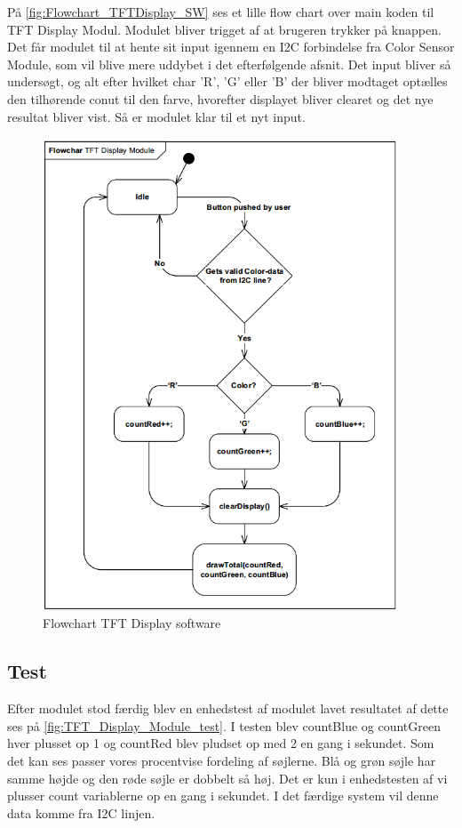 På \autoref{fig:Flowchart_TFTDisplay_SW} ses et lille flow chart over main koden til TFT Display Modul. Modulet bliver trigget af at brugeren trykker på knappen. Det får modulet til at hente sit input igennem en I2C forbindelse fra Color Sensor Module, som vil blive mere uddybet i det efterfølgende afsnit. Det input bliver så undersøgt, og alt efter hvilket char 'R', 'G' eller 'B' der bliver modtaget optælles den tilhørende conut til den farve, hvorefter displayet bliver clearet og det nye resultat bliver vist. Så er modulet klar til et nyt input.
\begin{figure}[H]
	\centering
	\includegraphics[width = 300pt]{Img/Flowchart_TFTDisplay_SW.png}
	\caption{Flowchart TFT Display software}
	\label{fig:Flowchart_TFTDisplay_SW}
\end{figure}


\subsection{Test}
Efter modulet stod færdig blev en enhedstest af modulet lavet resultatet af dette ses på \autoref{fig:TFT_Display_Module_test}. I testen blev countBlue og countGreen hver plusset op 1 og countRed blev pludset op med 2 en gang i sekundet. Som det kan ses passer vores procentvise fordeling af søjlerne. Blå og grøn søjle har samme højde og den røde søjle er dobbelt så høj. Det er kun i enhedstesten af vi plusser count variablerne op en gang i sekundet. I det færdige system vil denne data komme fra I2C linjen. 


